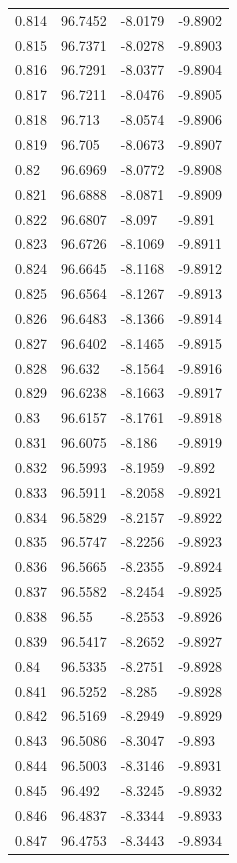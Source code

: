 \begin{tabular}{llll}
0.814 & 96.7452 & -8.0179 & -9.8902 \\
0.815 & 96.7371 & -8.0278 & -9.8903 \\
0.816 & 96.7291 & -8.0377 & -9.8904 \\
0.817 & 96.7211 & -8.0476 & -9.8905 \\
0.818 & 96.713 & -8.0574 & -9.8906 \\
0.819 & 96.705 & -8.0673 & -9.8907 \\
0.82 & 96.6969 & -8.0772 & -9.8908 \\
0.821 & 96.6888 & -8.0871 & -9.8909 \\
0.822 & 96.6807 & -8.097 & -9.891 \\
0.823 & 96.6726 & -8.1069 & -9.8911 \\
0.824 & 96.6645 & -8.1168 & -9.8912 \\
0.825 & 96.6564 & -8.1267 & -9.8913 \\
0.826 & 96.6483 & -8.1366 & -9.8914 \\
0.827 & 96.6402 & -8.1465 & -9.8915 \\
0.828 & 96.632 & -8.1564 & -9.8916 \\
0.829 & 96.6238 & -8.1663 & -9.8917 \\
0.83 & 96.6157 & -8.1761 & -9.8918 \\
0.831 & 96.6075 & -8.186 & -9.8919 \\
0.832 & 96.5993 & -8.1959 & -9.892 \\
0.833 & 96.5911 & -8.2058 & -9.8921 \\
0.834 & 96.5829 & -8.2157 & -9.8922 \\
0.835 & 96.5747 & -8.2256 & -9.8923 \\
0.836 & 96.5665 & -8.2355 & -9.8924 \\
0.837 & 96.5582 & -8.2454 & -9.8925 \\
0.838 & 96.55 & -8.2553 & -9.8926 \\
0.839 & 96.5417 & -8.2652 & -9.8927 \\
0.84 & 96.5335 & -8.2751 & -9.8928 \\
0.841 & 96.5252 & -8.285 & -9.8928 \\
0.842 & 96.5169 & -8.2949 & -9.8929 \\
0.843 & 96.5086 & -8.3047 & -9.893 \\
0.844 & 96.5003 & -8.3146 & -9.8931 \\
0.845 & 96.492 & -8.3245 & -9.8932 \\
0.846 & 96.4837 & -8.3344 & -9.8933 \\
0.847 & 96.4753 & -8.3443 & -9.8934 \\

\end{tabular}
